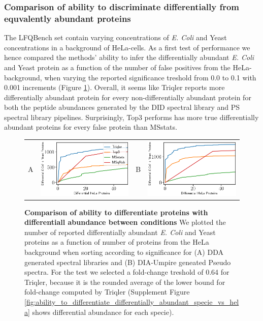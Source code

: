 \documentclass[10pt,letterpaper]{article}
\begin{document}
\subsubsection*{Comparison of ability to discriminate differentially from equvalently abundant proteins}

The LFQBench set contain varying concentrations of {\em E. Coli} and Yeast concentrations in a background of HeLa-cells. As a first test of performance we hence compared the methods' ability to infer the differentially abundant {\em E. Coli} and Yeast protein as a function of the number of false positives from the HeLa-background, when varying the reported significance treshold from 0.0 to 0.1 with 0.001 increments (Figure \ref{fig:diff_vs_hela}). Overall, it seems like Triqler reports more differentially abundant protein for every non-differentially abundant protein for both the peptide abundances generated by the DID spectral library and PS spectral library pipelines. Surprisingly, Top3 performs has more true differentially abundant proteins for every false protein than MSstats. 


\begin{figure}[hbt]
    \centering
    \begin{tabular}{lclc} 
        A & \includegraphics[width=0.45\linewidth]{../../result/report_plots_filtered/osw_de_human_vs_ecoli_and_yeast.png} & 
        B & \includegraphics[width=0.45\linewidth]{../../result/report_plots_filtered/diann_de_human_vs_ecoli_and_yeast.png} \\ 

    \end{tabular} 
    \caption{{\bf Comparison of ability to differentiate proteins with differentiall abundance between conditions} We plotted the number of reported differentially abundant  {\em E. Coli} and Yeast proteins as a function of number of proteins from the HeLa background when sorting according to significance for (A) DDA generated spectral libraries and (B) DIA-Umpire geneated Pseudo spectra. For the test we selected a fold-change treshold of 0.64 for Triqler, because it is the rounded average of the lower bound for fold-change computed by Triqler (Supplement Figure \ref{fig:ability_to_differentiate_differentially_abundant_specie_vs_hela} shows differential abundance for each specie). \label{fig:diff_vs_hela}}
\end{figure}
\end{document}
